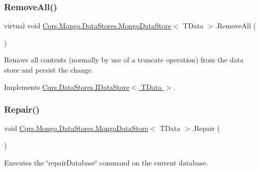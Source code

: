 \subsubsection{\texorpdfstring{Remove\+All()}{RemoveAll()}}
{\footnotesize\ttfamily virtual void \hyperlink{classCqrs_1_1Mongo_1_1DataStores_1_1MongoDataStore}{Cqrs.\+Mongo.\+Data\+Stores.\+Mongo\+Data\+Store}$<$ T\+Data $>$.Remove\+All (\begin{DoxyParamCaption}{ }\end{DoxyParamCaption})\hspace{0.3cm}{\ttfamily [virtual]}}



Remove all contents (normally by use of a truncate operation) from the data store and persist the change. 



Implements \hyperlink{interfaceCqrs_1_1DataStores_1_1IDataStore_aead8d7a39a717d29af05daf7b64bea94_aead8d7a39a717d29af05daf7b64bea94}{Cqrs.\+Data\+Stores.\+I\+Data\+Store$<$ T\+Data $>$}.

\mbox{\label{classCqrs_1_1Mongo_1_1DataStores_1_1MongoDataStore_a1c26771b4a655e138b55b8082795a52f_a1c26771b4a655e138b55b8082795a52f}} 
\subsubsection{\texorpdfstring{Repair()}{Repair()}}
{\footnotesize\ttfamily void \hyperlink{classCqrs_1_1Mongo_1_1DataStores_1_1MongoDataStore}{Cqrs.\+Mongo.\+Data\+Stores.\+Mongo\+Data\+Store}$<$ T\+Data $>$.Repair (\begin{DoxyParamCaption}{ }\end{DoxyParamCaption})}



Executes the \char`\"{}repair\+Database\char`\"{} command on the current database. 

\mbox{\label{classCqrs_1_1Mongo_1_1DataStores_1_1MongoDataStore_a03aac0495445d34f124db893cd09cbd8_a03aac0495445d34f124db893cd09cbd8}} 
